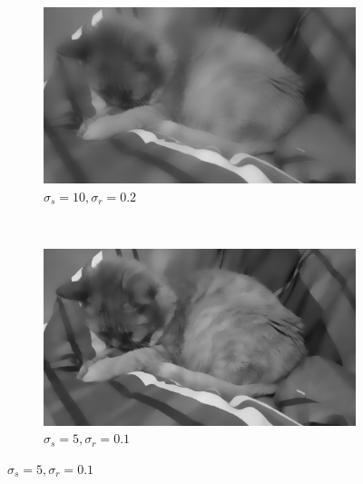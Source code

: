 \documentclass[a4spaper]{article}
\begin{document}
\begin{figure}[ht]
	\centering
	\begin{subfigure}[h]{0.48\textwidth}
		\centering
		\includegraphics[width=\textwidth]{jerry_flt_10_0-2}
		\caption*{$\sigma_s = 10, \sigma_r = 0.2$}
	\end{subfigure}
	~ 
	\begin{subfigure}[h]{0.48\textwidth}
		\centering
		\includegraphics[width=\textwidth]{jerry_flt_5_0-1}
		\caption*{$\sigma_s = 5, \sigma_r = 0.1$}
	\end{subfigure}	
	

\end{figure}
\end{document}
